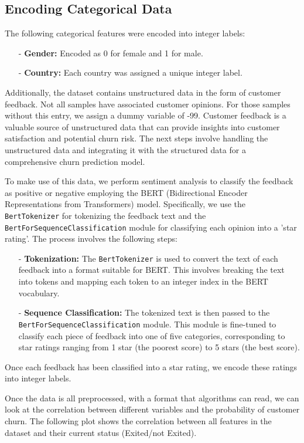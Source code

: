 \documentclass[12pt]{article}
\begin{document}
\subsection{Encoding Categorical Data}
The following categorical features were encoded into integer labels:
\begin{itemize}
    \item[-] \textbf{Gender:} Encoded as 0 for female and 1 for male.
    \item[-] \textbf{Country:} Each country was assigned a unique integer label.
\end{itemize}
 
Additionally, the dataset contains unstructured data in the form of customer feedback. Not all samples have associated customer opinions. For those samples without this entry, we assign a dummy variable of -99. Customer feedback is a valuable source of unstructured data that can provide insights into customer satisfaction and potential churn risk. The next steps involve handling the unstructured data and integrating it with the structured data for a comprehensive churn prediction model.

To make use of this data, we perform sentiment analysis to classify the feedback as positive or negative employing the BERT (Bidirectional Encoder Representations from Transformers) model. Specifically, we use the \texttt{BertTokenizer} for tokenizing the feedback text and the \texttt{BertForSequenceClassification} module for classifying each opinion into a 'star rating'. The process involves the following steps:
\begin{itemize}
    \item[-] \textbf{Tokenization:} The \texttt{BertTokenizer} is used to convert the text of each feedback into a format suitable for BERT. This involves breaking the text into tokens and mapping each token to an integer index in the BERT vocabulary.
    \item[-] \textbf{Sequence Classification:} The tokenized text is then passed to the \texttt{BertForSequenceClassification} module. This module is fine-tuned to classify each piece of feedback into one of five categories, corresponding to star ratings ranging from 1 star (the poorest score) to 5 stars (the best score).
\end{itemize}  Once each feedback has been classified into a star rating, we encode these ratings into integer labels. 

Once the data is all preprocessed, with a format that algorithms can read, we can look at the correlation between different variables and the probability of customer churn. The following plot shows the correlation between all features in the dataset and their current status (Exited/not Exited). 
\end{document}
